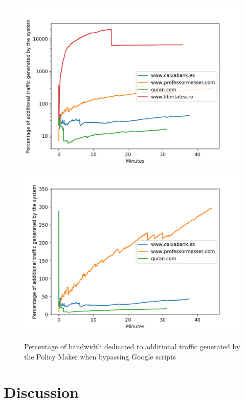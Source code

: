 \begin{description}
\begin{figure}[h]
	\centering
	\includegraphics[width=\textwidth]{imgs/netword_usage_bypass.png}
	\includegraphics[width=\textwidth]{imgs/netword_usage_long_bypass.png}
	\caption{Percentage of bandwidth dedicated to additional traffic generated by the Policy Maker when bypassing Google scripts}
	\label{bypassedUsage}
\end{figure}


\section{Discussion}



\end{description}
